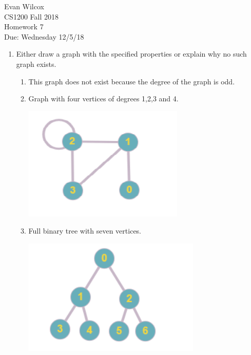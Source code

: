 \documentclass{article}
\begin{document}
        
\begin{flushleft}
    Evan Wilcox\\
    CS1200 Fall 2018\\
    Homework 7\\
    Due: Wednesday 12/5/18
\end{flushleft}
        
\begin{enumerate}

    \item Either draw a graph with the specified properties
    or explain why no such graph exists.

    \begin{enumerate}
        \item This graph does not exist because the degree of the graph is odd.
        
        \item Graph with four vertices of degrees 1,2,3 and 4.
        \begin{center}
            \includegraphics[scale=0.8]{1b}
        \end{center}

        \item Full binary tree with seven vertices.
        \begin{center}
            \includegraphics[scale=0.8]{1c}
        \end{center}
        

\end{enumerate}
\end{enumerate}
\end{document}
